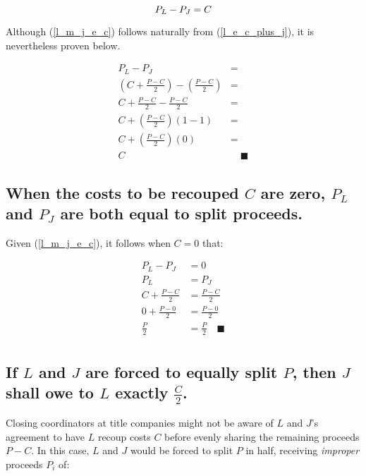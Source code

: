 \documentclass[10pt,letterpaper,oneside]{article}
\begin{document}
\begin{equation}
P_L - P_J = C       \label{l_m_j_e_c}\\[10pt]
\end{equation}

\noindent
Although (\ref{l_m_j_e_c}) follows naturally from (\ref{l_e_c_plus_j}), it is nevertheless proven below.

\begin{align*}
P_L - P_J &= \\[10pt]
\left(C + \frac{P-C}{2}\right) - \left(\frac{P-C}{2}\right) &= \\[10pt]
C + \frac{P-C}{2} - \frac{P-C}{2} &= \\[10pt]
C + \left(\frac{P-C}{2}\right)(1-1) &= \\[10pt]
C + \left(\frac{P-C}{2}\right)(0) &= \\[10pt]
C & \quad\blacksquare
\end{align*}


\newpage
\subsection{When the costs to be recouped $C$ are zero, $P_L$ and $P_J$ are both equal to split proceeds.}
Given (\ref{l_m_j_e_c}), it follows when $C=0$ that:

\begin{align*}
P_L - P_J &= 0                      \\[10pt]
P_L &= P_J                          \\[10pt]
C + \frac{P-C}{2} &= \frac{P-C}{2}  \\[10pt]
0 + \frac{P-0}{2} &= \frac{P-0}{2}  \\[10pt]
\frac{P}{2} &= \frac{P}{2}          \quad\blacksquare   \\[10pt]
\end{align*}


\newpage
\subsection{If $L$ and $J$ are forced to equally split $P$, then $J$ shall owe to $L$ exactly $\frac{C}{2}$.}

Closing coordinators at title companies might not be aware of $L$ and $J$'s agreement to have $L$ recoup
costs $C$ before evenly sharing the remaining proceeds $P-C$.
In this case, $L$ and $J$ would be forced to split $P$ in half,
receiving \emph{improper} proceeds $P_i$ of:
\end{document}
